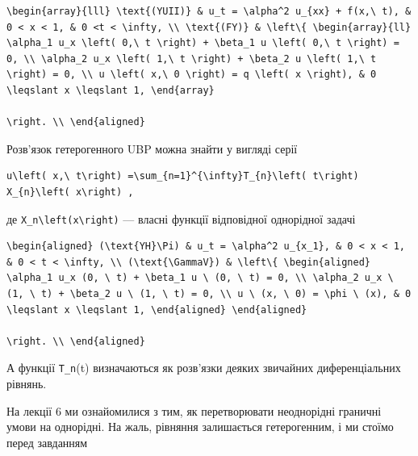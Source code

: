 \documentclass[
  ukrainian,
]{article}
\begin{document}
\begin{verbatim}
\begin{array}{lll} \text{(YUII)} & u_t = \alpha^2 u_{xx} + f(x,\ t), & 0 < x < 1, & 0 <t < \infty, \\ \text{(FY)} & \left\{ \begin{array}{ll} \alpha_1 u_x \left( 0,\ t \right) + \beta_1 u \left( 0,\ t \right) = 0, \\ \alpha_2 u_x \left( 1,\ t \right) + \beta_2 u \left( 1,\ t \right) = 0, \\ u \left( x,\ 0 \right) = q \left( x \right), & 0 \leqslant x \leqslant 1, \end{array}

\right. \\ \end{aligned}
\end{verbatim}

Розв'язок гетерогенного UBP можна знайти у вигляді серії

\begin{verbatim}
u\left( x,\ t\right) =\sum_{n=1}^{\infty}T_{n}\left( t\right) X_{n}\left( x\right) ,
\end{verbatim}

де \texttt{X\_n\textbackslash{}left(x\textbackslash{}right)} --- власні
функції відповідної однорідної задачі

\begin{verbatim}
\begin{aligned} (\text{YH}\Pi) & u_t = \alpha^2 u_{x_1}, & 0 < x < 1, & 0 < t < \infty, \\ (\text{\GammaV}) & \left\{ \begin{aligned} \alpha_1 u_x (0, \ t) + \beta_1 u \ (0, \ t) = 0, \\ \alpha_2 u_x \ (1, \ t) + \beta_2 u \ (1, \ t) = 0, \\ u \ (x, \ 0) = \phi \ (x), & 0 \leqslant x \leqslant 1, \end{aligned} \end{aligned}

\right. \\ \end{aligned}
\end{verbatim}

А функції \texttt{T\_n}(t) визначаються як розв'язки деяких звичайних
диференціальних рівнянь.

На лекції 6 ми ознайомилися з тим, як перетворювати неоднорідні граничні
умови на однорідні. На жаль, рівняння залишається гетерогенним, і ми
стоїмо перед завданням
\end{document}
